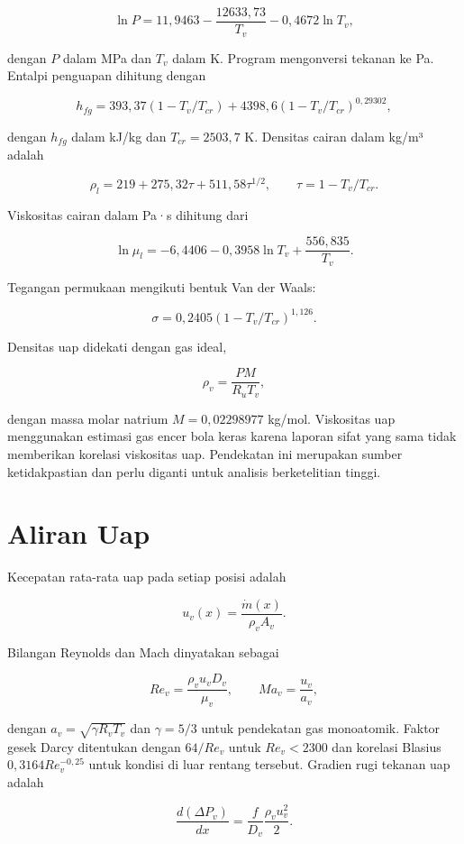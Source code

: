 \documentclass[
  12pt,
  12pt,a4paper,oneside]{report}
\begin{document}
\[
\ln P=11{,}9463-\frac{12633{,}73}{T_v}-0{,}4672\ln T_v,
\tag{3.4}\]

dengan \(P\) dalam MPa dan \(T_v\) dalam K. Program mengonversi tekanan
ke Pa. Entalpi penguapan dihitung dengan

\[
h_{fg}=393{,}37(1-T_v/T_{cr})+4398{,}6(1-T_v/T_{cr})^{0{,}29302},
\tag{3.5}\]

dengan \(h_{fg}\) dalam kJ/kg dan \(T_{cr}=2503{,}7\) K. Densitas cairan
dalam kg/m³ adalah

\[
\rho_l=219+275{,}32\tau+511{,}58\tau^{1/2},
\qquad \tau=1-T_v/T_{cr}.
\tag{3.6}\]

Viskositas cairan dalam Pa·s dihitung dari

\[
\ln\mu_l=-6{,}4406-0{,}3958\ln T_v+\frac{556{,}835}{T_v}.
\tag{3.7}\]

Tegangan permukaan mengikuti bentuk Van der Waals:

\[
\sigma=0{,}2405(1-T_v/T_{cr})^{1{,}126}.
\tag{3.8}\]

Densitas uap didekati dengan gas ideal,

\[
\rho_v=\frac{PM}{R_uT_v},
\tag{3.9}\]

dengan massa molar natrium \(M=0{,}02298977\) kg/mol. Viskositas uap
menggunakan estimasi gas encer bola keras karena laporan sifat yang sama
tidak memberikan korelasi viskositas uap. Pendekatan ini merupakan
sumber ketidakpastian dan perlu diganti untuk analisis berketelitian
tinggi.

\hypertarget{aliran-uap}{%
\section{Aliran Uap}\label{aliran-uap}}

Kecepatan rata-rata uap pada setiap posisi adalah

\[
u_v(x)=\frac{\dot m(x)}{\rho_v A_v}.
\tag{3.10}\]

Bilangan Reynolds dan Mach dinyatakan sebagai

\[
Re_v=\frac{\rho_v u_vD_v}{\mu_v},\qquad Ma_v=\frac{u_v}{a_v},
\tag{3.11}\]

dengan \(a_v=\sqrt{\gamma R_vT_v}\) dan \(\gamma=5/3\) untuk pendekatan
gas monoatomik. Faktor gesek Darcy ditentukan dengan \(64/Re_v\) untuk
\(Re_v<2300\) dan korelasi Blasius \(0{,}3164Re_v^{-0{,}25}\) untuk
kondisi di luar rentang tersebut. Gradien rugi tekanan uap adalah

\[
\frac{d(\Delta P_v)}{dx}=\frac{f}{D_v}\frac{\rho_v u_v^2}{2}.
\tag{3.12}\]
\end{document}
